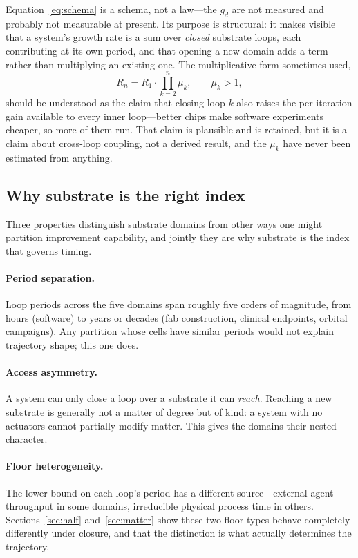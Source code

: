 \documentclass[11pt]{article}
\begin{document}
Equation~\eqref{eq:schema} is a schema, not a law---the $g_d$ are not measured and probably not measurable at present. Its purpose is structural: it makes visible that a system's growth rate is a sum over \emph{closed} substrate loops, each contributing at its own period, and that opening a new domain adds a term rather than multiplying an existing one. The multiplicative form sometimes used,
\[
R_n = R_1 \cdot \prod_{k=2}^{n} \mu_k, \qquad \mu_k > 1,
\]
should be understood as the claim that closing loop $k$ also raises the per-iteration gain available to every inner loop---better chips make software experiments cheaper, so more of them run. That claim is plausible and is retained, but it is a claim about cross-loop coupling, not a derived result, and the $\mu_k$ have never been estimated from anything.

\subsection{Why substrate is the right index}

Three properties distinguish substrate domains from other ways one might partition improvement capability, and jointly they are why substrate is the index that governs timing.

\paragraph{Period separation.} Loop periods across the five domains span roughly five orders of magnitude, from hours (software) to years or decades (fab construction, clinical endpoints, orbital campaigns). Any partition whose cells have similar periods would not explain trajectory shape; this one does.

\paragraph{Access asymmetry.} A system can only close a loop over a substrate it can \emph{reach}. Reaching a new substrate is generally not a matter of degree but of kind: a system with no actuators cannot partially modify matter. This gives the domains their nested character.

\paragraph{Floor heterogeneity.} The lower bound on each loop's period has a different source---external-agent throughput in some domains, irreducible physical process time in others. Sections~\ref{sec:half} and~\ref{sec:matter} show these two floor types behave completely differently under closure, and that the distinction is what actually determines the trajectory.
\end{document}
